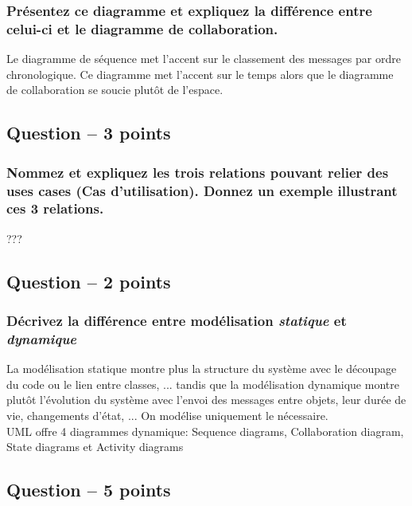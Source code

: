 \subsubsection{Présentez ce diagramme et expliquez la différence entre celui-ci et le diagramme de collaboration.}
\textcolor[rgb]{0,0.48,0.58}{Le diagramme de séquence met l'accent sur le classement des messages par ordre chronologique. Ce diagramme met l'accent sur le temps alors que le diagramme de collaboration se soucie plutôt de l'espace.}



\subsection{Question – 3 points}



\subsubsection{Nommez et expliquez les trois relations pouvant relier des uses cases (Cas d'utilisation). Donnez un exemple illustrant ces 3 relations.}
\textcolor[rgb]{0,0.48,0.58}{???}



\subsection{Question – 2 points}



\subsubsection{Décrivez la différence entre modélisation \textsl{statique} et \textsl{dynamique}}
\textcolor[rgb]{0,0.48,0.58}{La modélisation statique montre plus la structure du système
 avec le découpage du code ou le lien entre classes, ... tandis que la modélisation dynamique montre plutôt l’évolution du système avec l'envoi des messages entre objets, leur durée de vie, changements d’état, ... On modélise uniquement le nécessaire.
\\UML offre 4 diagrammes dynamique: Sequence diagrams, Collaboration diagram, State diagrams et Activity diagrams}



\subsection{Question – 5 points}
